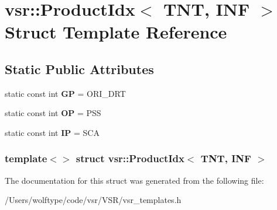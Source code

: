 \hypertarget{structvsr_1_1_product_idx_3_01_t_n_t_00_01_i_n_f_01_4}{\section{vsr\-:\-:Product\-Idx$<$ T\-N\-T, I\-N\-F $>$ Struct Template Reference}
\label{structvsr_1_1_product_idx_3_01_t_n_t_00_01_i_n_f_01_4}
}
\subsection*{Static Public Attributes}
\begin{DoxyCompactItemize}
\item 
\hypertarget{structvsr_1_1_product_idx_3_01_t_n_t_00_01_i_n_f_01_4_abdcb8e9cdfb14f3283c9db7679b551fa}{static const int {\bfseries G\-P} = O\-R\-I\-\_\-\-D\-R\-T}\label{structvsr_1_1_product_idx_3_01_t_n_t_00_01_i_n_f_01_4_abdcb8e9cdfb14f3283c9db7679b551fa}

\item 
\hypertarget{structvsr_1_1_product_idx_3_01_t_n_t_00_01_i_n_f_01_4_a7895444925685bf596187e0b3351b825}{static const int {\bfseries O\-P} = P\-S\-S}\label{structvsr_1_1_product_idx_3_01_t_n_t_00_01_i_n_f_01_4_a7895444925685bf596187e0b3351b825}

\item 
\hypertarget{structvsr_1_1_product_idx_3_01_t_n_t_00_01_i_n_f_01_4_a30d9bccef8bbf5961700afc8204c7892}{static const int {\bfseries I\-P} = S\-C\-A}\label{structvsr_1_1_product_idx_3_01_t_n_t_00_01_i_n_f_01_4_a30d9bccef8bbf5961700afc8204c7892}

\end{DoxyCompactItemize}
\subsubsection*{template$<$$>$ struct vsr\-::\-Product\-Idx$<$ T\-N\-T, I\-N\-F $>$}



The documentation for this struct was generated from the following file\-:\begin{DoxyCompactItemize}
\item 
/\-Users/wolftype/code/vsr/\-V\-S\-R/vsr\-\_\-templates.\-h\end{DoxyCompactItemize}
